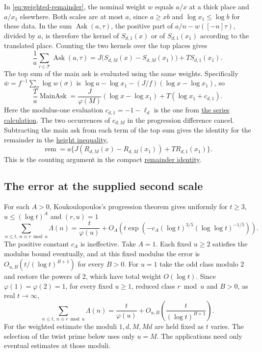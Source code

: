 In \eqref{eq:weighted-remainder}, the nominal weight \(w\) equals \(a/x\)
at a thick place and \(a/x_1\) elsewhere. Both scales are at most \(a\),
since \(a\ge xb\)
and \(\log x_1\le\log b\) for these data. In the sum
\(\operatorname{Ask}(a,\tau)\), the positive part of
\(a/n-w([-n]\tau)\), divided by \(a\), is therefore the kernel of
\(S_{d,1}(x)\) or of \(S_{d,1}(x_1)\) according to the translated
place. Counting the two kernels over the top places gives
\[
 \frac1a\sum_{\tau\in\mathcal T}\operatorname{Ask}(a,\tau)
 =J\bigl(S_{d,M}(x)-S_{d,M}(x_1)\bigr)+T S_{d,1}(x_1).
\]
The top sum of the main ask is evaluated using the same weights.
Specifically \(\bar w=f^{-1}\sum_\sigma\log w(\sigma)\) is
\(\log a-\log x_1-(J/f)(\log x-\log x_1)\), so
\[
 \frac{T}{a}\operatorname{MainAsk}
 =\frac{J}{\varphi(M)}(\log x-\log x_1)+T(\log x_1+c_{d,1}).
\]
Here the modulus-one evaluation \(c_{d,1}=-1-\ell_d\) is the one from
\hyperlink{proof.weighted-prime-series}{the series calculation}.
The two occurrences of \(c_{d,M}\) in the progression difference cancel.
Subtracting the main ask from each term of the top sum gives the identity
for the remainder in the \hyperlink{proof.weighted-height}{height inequality},
\begin{equation}\label{eq:weighted-prime-identity}
 \operatorname{rem}=a\{J(R_{d,M}(x)-R_{d,M}(x_1))+T R_{d,1}(x_1)\}.
\end{equation}
This is the counting argument in the compact
\href{https://github.com/lsernau/grh-lean/blob/72fead102f663d5c7a407964a13dc0cf9d977207/grh-compact/src/New/Endgame/ShortAndEnough.lean\#L84-L112}{remainder identity}.

\subsection*{The error at the supplied second scale}

%
%
For each \(A>0\), Koukoulopoulos's progression theorem gives
uniformly for \(t\ge3\), \(u\le(\log t)^A\) and \((r,u)=1\)
\[
 \sum_{n\le t,\ n\equiv r\bmod u}\Lambda(n)
 =\frac{t}{\varphi(u)}
  +O_A\!\left(t\exp\!\left(-c_A(\log t)^{3/5}
                             (\log\log t)^{-1/5}\right)\right).
\]
The positive constant \(c_A\) is ineffective.
\cite[Theorem~1.1, arXiv v3, p.~2]{f1koukoulopoulos}
Take \(A=1\). Each fixed \(u\ge2\) satisfies the modulus bound
eventually, and at this fixed modulus the error is
\(O_{u,B}(t/(\log t)^{B+1})\) for every \(B>0\).
For \(u=1\) take the odd class modulo \(2\) and restore the powers of
\(2\), which have total weight \(O(\log t)\). Since
\(\varphi(1)=\varphi(2)=1\), for every fixed \(u\ge1\), reduced class
\(r\bmod u\) and \(B>0\), as real \(t\to\infty\),
\begin{equation}\label{eq:weighted-fixed-pnt}
 \sum_{n\le t,\ n\equiv r\bmod u}\Lambda(n)
 =\frac{t}{\varphi(u)}+O_{u,B}\!\left(\frac{t}{(\log t)^{B+1}}\right).
\end{equation}
For the weighted estimate the moduli \(1,d,M,Md\) are held fixed as
\(t\) varies. The selection of the twist prime below uses only
\(u=M\). The applications need only eventual estimates at those moduli.


